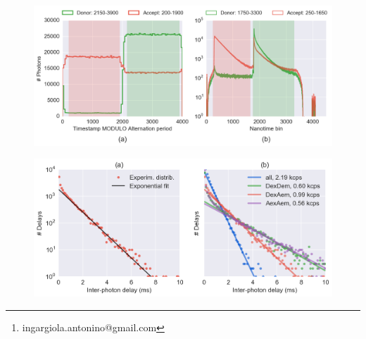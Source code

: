 
\title{}
\author{Antonino Ingargiola\thanks{ingargiola.antonino@gmail.com} \and Eitan Lerner  
\and SangYoon Chung \and Shimon Weiss \and Xavier Michalet}


\verbatimfont{\small}
\lstset{language=Python}

\maketitle

\begin{abstract}

\end{abstract}

\tableofcontents







\begin{figure}
\begin{center}
\includegraphics[width=\doublefig]{"figures/ALEX_alternation_double/ALEX_alternation_double"}
\caption[]{}
\end{center}
\end{figure}





\begin{figure}
\begin{center}
\includegraphics[width=\doublefig]{"figures/ph_delays_distrib_all/ph_delays_distrib_all"}
\caption[]{}
\end{center}
\end{figure}

